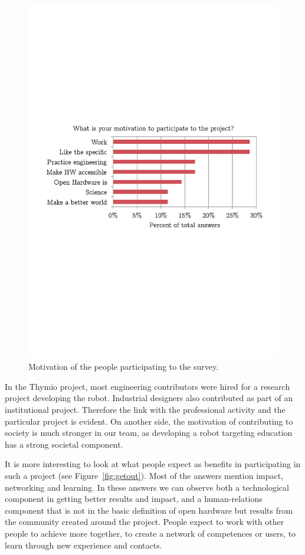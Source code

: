 \documentclass[letterpaper, 10 pt, conference]{ieeeconf}  %
\begin{document}
\begin{figure}
\centering
\includegraphics[width=\columnwidth]{figures/motivation}
\caption{Motivation of the people participating to the survey.}
\label{fig:motivation}
\end{figure}

In the Thymio project, most engineering contributors were hired for a research project developing the robot. 
Industrial designers also contributed as part of an institutional project.
Therefore the link with the professional activity and the particular project is evident.
On another side, the motivation of contributing to society is much stronger in our team, as developing a robot targeting education has a strong societal component.

It is more interesting to look at what people expect as benefits in participating in such a project (see Figure~\ref{fig:getout}).
Most of the answers mention impact, networking and learning. 
In these answers we can observe both a technological component in getting better results and impact, and a human-relations component that is not in the basic definition of open hardware but results from the community created around the project. 
People expect to work with other people to achieve more together, to create a network of competences or users, to learn through new experience and contacts. 
\end{document}
